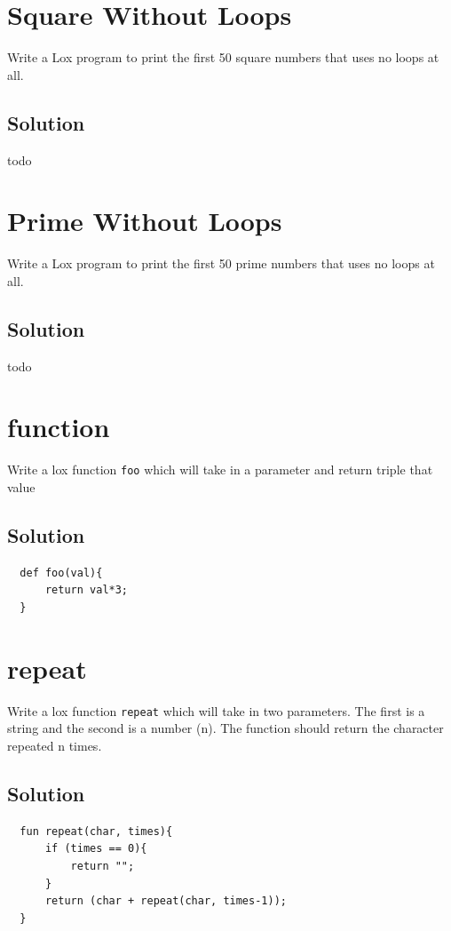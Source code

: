 \documentclass[twoside=false, DIV=14]{scrartcl}
\begin{document}
\section*{Square Without Loops}
Write a Lox program to print the first 50 square numbers that uses no loops at all.

\subsection*{Solution}
todo

\section*{Prime Without Loops}
Write a Lox program to print the first 50 prime numbers that uses no loops at all.

\subsection*{Solution}
todo

\section*{function}
  Write a lox function \lstinline|foo| which will take in a parameter and return triple that value

\subsection*{Solution}
\begin{lstlisting}
  def foo(val){
      return val*3;
  }
\end{lstlisting}


\section*{repeat}
  Write a lox function \lstinline|repeat| which will take in two parameters.  The first is a string and the second is a number (n).  The function should return the character repeated n times.
\subsection*{Solution}
\begin{lstlisting}
  fun repeat(char, times){
      if (times == 0){
          return "";
      }
      return (char + repeat(char, times-1));
  }
\end{lstlisting}
\end{document}
